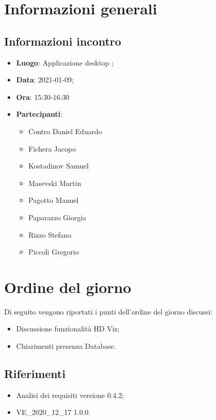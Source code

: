 \documentclass{article}
\begin{document}


\section{Informazioni generali}
\label{sec:info_generali}

\subsection{Informazioni incontro}
\label{sub:info_incontro}

\begin{itemize}
	\item \textbf{Luogo}: Applicazione desktop ;
	\item \textbf{Data}: 2021-01-09;
	\item \textbf{Ora}: 15:30-16:30
	\item \textbf{Partecipanti}:
	\begin{itemize}
		\item Contro Daniel Eduardo
		\item Fichera Jacopo
		\item Kostadinov Samuel
		\item Masevski Martin
		\item Pagotto Manuel
		\item Paparazzo Giorgia
		\item Rizzo Stefano
		\item Piccoli Gregorio
	\end{itemize}
\end{itemize}

\section{Ordine del giorno}%
\label{sec:ordine_del_giorno}

Di seguito vengono riportati i punti dell'ordine del giorno discussi:
\begin{itemize}
    \item Discussione funzionalità HD Viz;
    \item Chiarimenti presenza Database.
\end{itemize}


\subsection{Riferimenti}%
\label{sub:riferimenti}
\begin{itemize}
    \item Analisi dei requisiti versione 0.4.2;
	\item VE\_2020\_12\_17 1.0.0.
\end{itemize}
\end{document}

